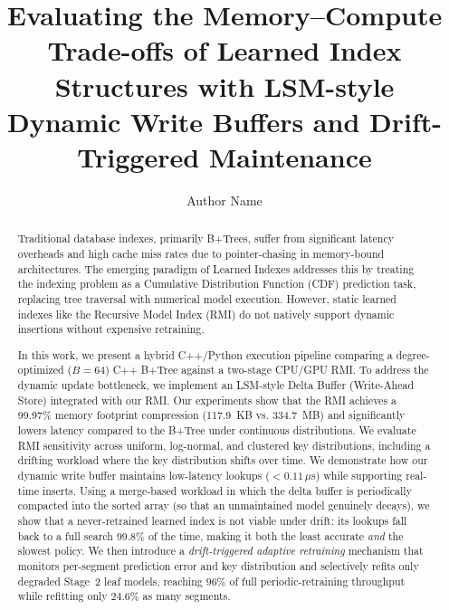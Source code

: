 \documentclass[sigconf,nonacm]{acmart}
\begin{document}
\title{Evaluating the Memory--Compute Trade-offs of Learned Index Structures with LSM-style Dynamic Write Buffers and Drift-Triggered Maintenance}

\author{Author Name}

\begin{abstract}
Traditional database indexes, primarily B+Trees, suffer from significant latency overheads and high cache miss rates due to pointer-chasing in memory-bound architectures. The emerging paradigm of Learned Indexes addresses this by treating the indexing problem as a Cumulative Distribution Function (CDF) prediction task, replacing tree traversal with numerical model execution. However, static learned indexes like the Recursive Model Index (RMI) do not natively support dynamic insertions without expensive retraining. 

In this work, we present a hybrid C++/Python execution pipeline comparing a degree-optimized ($B=64$) C++ B+Tree against a two-stage CPU/GPU RMI. To address the dynamic update bottleneck, we implement an LSM-style Delta Buffer (Write-Ahead Store) integrated with our RMI. Our experiments show that the RMI achieves a 99.97\% memory footprint compression (117.9~KB vs. 334.7~MB) and significantly lowers latency compared to the B+Tree under continuous distributions. We evaluate RMI sensitivity across uniform, log-normal, and clustered key distributions, including a drifting workload where the key distribution shifts over time. We demonstrate how our dynamic write buffer maintains low-latency lookups ($<0.11\,\mu$s) while supporting real-time inserts. Using a merge-based workload in which the delta buffer is periodically compacted into the sorted array (so that an unmaintained model genuinely decays), we show that a never-retrained learned index is not viable under drift: its lookups fall back to a full search $99.8\%$ of the time, making it both the least accurate \textit{and} the slowest policy. We then introduce a \textit{drift-triggered adaptive retraining} mechanism that monitors per-segment prediction error and key distribution and selectively refits only degraded Stage~2 leaf models, reaching $96\%$ of full periodic-retraining throughput while refitting only $24.6\%$ as many segments.
\end{abstract}
\end{document}
